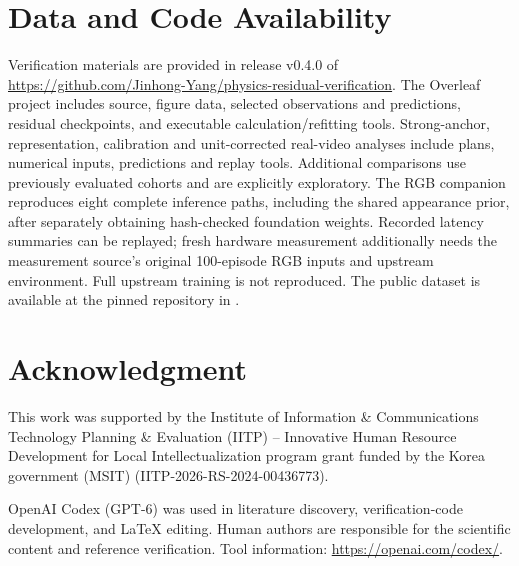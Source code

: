 \documentclass{ieeeaccess}
\begin{document}
\section*{Data and Code Availability}
Verification materials are provided in release v0.4.0 of \url{https://github.com/Jinhong-Yang/physics-residual-verification}. The Overleaf project includes source, figure data, selected observations and predictions, residual checkpoints, and executable calculation/refitting tools. Strong-anchor, representation, calibration and unit-corrected real-video analyses include plans, numerical inputs, predictions and replay tools. Additional comparisons use previously evaluated cohorts and are explicitly exploratory. The RGB companion reproduces eight complete inference paths, including the shared appearance prior, after separately obtaining hash-checked foundation weights. Recorded latency summaries can be replayed; fresh hardware measurement additionally needs the measurement source's original 100-episode RGB inputs and upstream environment. Full upstream training is not reproduced. The public dataset is available at the pinned repository in \cite{physprobe2026dataset}.

\section*{Acknowledgment}
This work was supported by the Institute of Information \& Communications Technology Planning \& Evaluation (IITP) -- Innovative Human Resource Development for Local Intellectualization program grant funded by the Korea government (MSIT) (IITP-2026-RS-2024-00436773).

\noindent\begin{minipage}{\columnwidth}
OpenAI Codex (GPT-6) was used in literature discovery, verification-code development, and \LaTeX{} editing. Human authors are responsible for the scientific content and reference verification. Tool information: \url{https://openai.com/codex/}.
\end{minipage}
\end{document}
